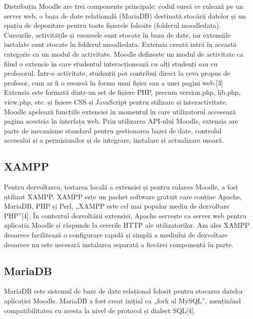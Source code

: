 Distribuția Moodle are trei componente principale: codul sursă ce rulează pe un server web, o baza de date relațională (MariaDB) destinată stocării datelor și un spațiu de depozitare pentru
toate fișierele folsoite (folderul moodledata). Cursurile, activitățile și resursele sunt stocate în baza de date, iar extensiile instalate sunt stocate în folderul moodledata. Extensia 
creată intră în această categorie ca un modul de activitate. Moodle definește un modul de activitate ca fiind o extensie în care studentul interacționează cu alți studenți sau cu 
profesorul. Într-o activitate, studenții pot contribui direct la ceva propus de profesor, cum ar fi o resursă în forma unui fișier sau a unei pagini web.[3] Extensia este formată dintr-un
set de fișiere PHP, precum version.php, lib.php, view.php,  etc. și fișiere CSS și JavaScript pentru stilizare și interactivitate. Moodle apelează funcțiile extensiei în momentul în care
utilizatorul accesează pagina acesteia în interfața web. Prin utilizarea API-ului Moodle, extensia are parte de mecanisme standard pentru gestionarea bazei de date, controlul accesului
și a permisiunilor și de integrare, instalare și actualizare ușoară.

\subsection{XAMPP}

Pentru dezvoltarea, testarea locală a extensiei și pentru rularea Moodle, a fost utilizat XAMPP. XAMPP este un pachet software gratuit care conține Apache, MariaDB, PHP și 
Perl, „XAMPP este cel mai popular mediu de dezvoltare PHP”[4]. În contextul dezvoltării extensiei, Apache servește ca server web pentru aplicația Moodle și răspunde la cererile HTTP ale
utilizatorilor. Am ales XAMPP deoarece facilitează o configurare rapidă și simplă a mediului de dezvoltare deoarece nu este necesară instalarea separată a fiecărei componentă în parte.

\subsection{MariaDB}

MariaDB este sistemul de baze de date relațional folosit pentru stocarea datelor aplicației Moodle. MariaDB a fost creat inițial ca „fork al MySQL”, menținând compatibilitatea cu 
acesta la nivel de protocol și dialect SQL[4].